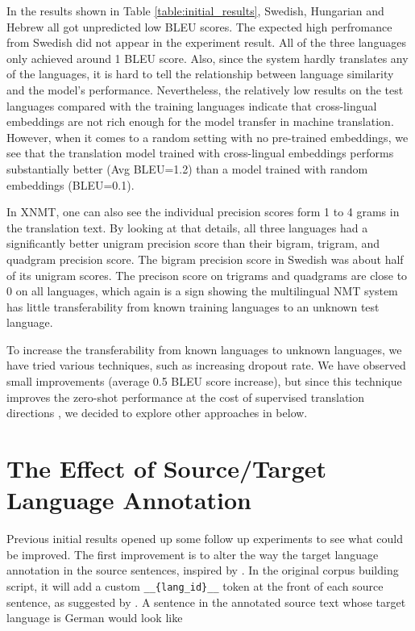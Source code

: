 \documentclass[thesis,fonts=libertine]{cluu}
\begin{document}
In the results shown in Table \ref{table:initial_results}, Swedish, Hungarian and Hebrew all got unpredicted low BLEU scores. The expected high perfromance from Swedish did not appear in the experiment result. All of the three languages only achieved around 1 BLEU score. Also, since the system hardly translates any of the languages, it is hard to tell the relationship between language similarity and the model's performance. Nevertheless, the relatively low results on the test languages compared with the training languages indicate that cross-lingual embeddings are not rich enough for the model transfer in machine translation. However, when it comes to a random setting with no pre-trained embeddings, we see that the translation model trained with cross-lingual embeddings performs substantially better (Avg BLEU=1.2) than a model trained with random embeddings (BLEU=0.1).

In XNMT, one can also see the individual precision scores form 1 to 4 grams in the translation text. By looking at that details, all three languages had a significantly better unigram precision score than their bigram, trigram, and quadgram precision score. The bigram precision score in Swedish was about half of its unigram scores. The precison score on trigrams and quadgrams are close to 0 on all languages, which again is a sign showing the multilingual NMT system has little transferability from known training languages to an unknown test language.

To increase the transferability from known languages to unknown languages, we have tried various techniques, such as increasing dropout rate. We have observed small improvements (average 0.5 BLEU score increase), but since this technique improves the zero-shot performance at the cost of supervised translation directions \textcite{Arivazhagan:2019aa}, we decided to explore other approaches in below.

\section{The Effect of Source/Target Language Annotation}

Previous initial results opened up some follow up experiments to see what could be improved. The first improvement is to alter the way the target language annotation in the source sentences, inspired by \textcite{Blackwood:2018aa}. In the original corpus building script, it will add a custom \verb|__{lang_id}__| token at the front of each source sentence, as suggested by \textcite{Johnson:2016aa}. A sentence in the annotated source text whose target language is German would look like 
\end{document}
